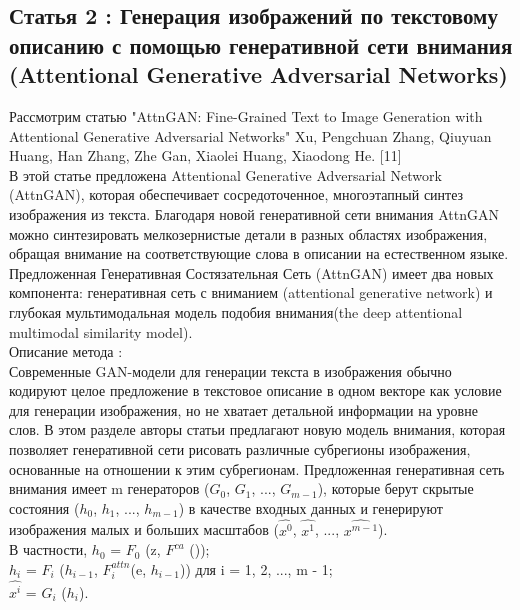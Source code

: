 \documentclass{article}
\begin{document}
\begin{center} 
\subsection{Статья 2 : Генерация изображений по текстовому описанию с помощью генеративной сети внимания (Attentional Generative Adversarial Networks)}
    \end{center} 
      \large Рассмотрим статью "AttnGAN: Fine-Grained Text to Image Generation with Attentional Generative Adversarial Networks" Xu, Pengchuan Zhang, Qiuyuan Huang, Han Zhang, Zhe Gan, Xiaolei Huang, Xiaodong He. [11] \\
      В этой статье предложена Attentional Generative Adversarial Network (AttnGAN), которая обеспечивает сосредоточенное,
многоэтапный синтез изображения из текста. Благодаря новой генеративной сети внимания AttnGAN можно синтезировать мелкозернистые детали в разных областях изображения, обращая внимание на соответствующие слова в описании на естественном языке.
Предложенная Генеративная Состязательная Сеть (AttnGAN) имеет два новых компонента: генеративная сеть с вниманием (attentional generative network) и глубокая
мультимодальная модель подобия внимания(the deep
attentional multimodal similarity model).\\

Описание метода :\\
Современные GAN-модели для генерации текста в изображения обычно кодируют целое предложение в текстовое описание в одном векторе как условие для генерации изображения, но не хватает детальной информации на уровне слов. В этом разделе авторы статьи предлагают новую модель внимания, которая позволяет генеративной сети рисовать различные субрегионы изображения, основанные на отношении к этим субрегионам.
Предложенная генеративная сеть внимания имеет m генераторов ($G_{0}$, $G_{1}$, ..., $G_{m - 1}$), которые берут скрытые состояния ($h_{0}$, $h_{1}$, ..., $h_{m - 1}$) в качестве входных данных и генерируют изображения малых и больших масштабов ($\hat{x^0}$, $\hat{x^1}$, ..., $\hat{x^{m - 1}}$).\\
В частности,
$h_{0}$ = $F_{0}$ (z, $F^{ca}$ ());\\
$h_{i}$ = $F_{i}$ ($h_{i - 1}$, $F^{attn}_{i} $(e, $h_{i - 1}$)) для i = 1, 2, ..., m - 1;\\
$\hat{x^i}$ = $G_{i}$ ($h_{i}$).
\end{document}
